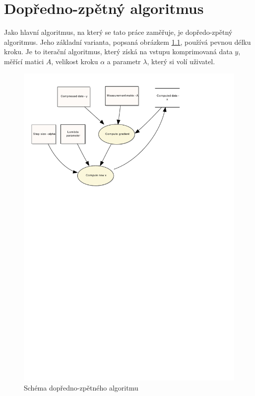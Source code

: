 \documentclass[FM,BP]{tulthesis}
\begin{document}
\chapter{Dopředno-zpětný algoritmus}
\label{ch:fwbw}
Jako hlavní algoritmus, na který se tato práce zaměřuje, je dopředo-zpětný algoritmus. Jeho základní varianta, popsaná obrázkem \ref{fig:fw-bw alg}, používá pevnou délku kroku. Je to iterační algoritmus, který získá na vstupu komprimovaná data $y$, měřící matici $A$, velikost kroku $\alpha$ a parametr $\lambda$, který si volí uživatel.
\begin{figure}[!ht]
\begin{center}
\includegraphics[scale=0.7]{obr/forwardbackward.pdf}
\end{center}
\caption{Schéma dopředno-zpětného algoritmu}
\label{fig:fw-bw alg}
\end{figure}
\end{document}
